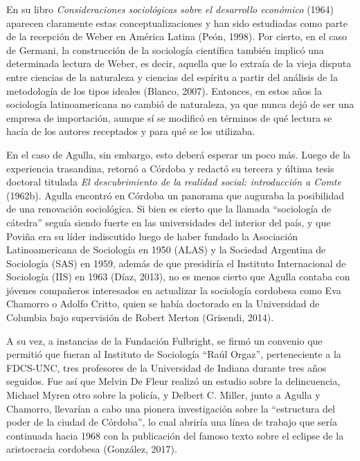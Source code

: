 En su libro \emph{Consideraciones sociológicas sobre el desarrollo económico} (1964) aparecen claramente estas conceptualizaciones y han sido estudiadas como parte de la recepción de Weber en América Latina (Peón, 1998). Por cierto, en el caso de Germani, la construcción de la sociología científica también implicó una determinada lectura de Weber, es decir, aquella que lo extraía de la vieja disputa entre ciencias de la naturaleza y ciencias del espíritu a partir del análisis de la metodología de los tipos ideales (Blanco, 2007). Entonces, en estos años la sociología latinoamericana no cambió de naturaleza, ya que nunca dejó de ser una empresa de importación, aunque sí se modificó en términos de qué lectura se hacía de los autores receptados y para qué se los utilizaba.

En el caso de Agulla, sin embargo, esto deberá esperar un poco más. Luego de la experiencia trasandina, retornó a Córdoba y redactó su tercera y última tesis doctoral titulada \emph{El descubrimiento de la realidad social: introducción a Comte} (1962b). Agulla encontró en Córdoba un panorama que auguraba la posibilidad de una renovación sociológica. Si bien es cierto que la llamada ``sociología de cátedra'' seguía siendo fuerte en las universidades del interior del país, y que Poviña era su líder indiscutido luego de haber fundado la Asociación Latinoamericana de Sociología en 1950 (ALAS) y la Sociedad Argentina de Sociología (SAS) en 1959, además de que presidiría el Instituto Internacional de Sociología (IIS) en 1963 (Díaz, 2013), no es menos cierto que Agulla contaba con jóvenes compañeros interesados en actualizar la sociología cordobesa como Eva Chamorro o Adolfo Critto, quien se había doctorado en la Universidad de Columbia bajo supervisión de Robert Merton (Grisendi, 2014).

A su vez, a instancias de la Fundación Fulbright, se firmó un convenio que permitió que fueran al Instituto de Sociología ``Raúl Orgaz'', perteneciente a la FDCS-UNC, tres profesores de la Universidad de Indiana durante tres años seguidos. Fue así que Melvin De Fleur realizó un estudio sobre la delincuencia, Michael Myren otro sobre la policía, y Delbert C. Miller, junto a Agulla y Chamorro, llevarían a cabo una pionera investigación sobre la ``estructura del poder de la ciudad de Córdoba'', lo cual abriría una línea de trabajo que sería continuada hacia 1968 con la publicación del famoso texto sobre el eclipse de la aristocracia cordobesa (González, 2017).

